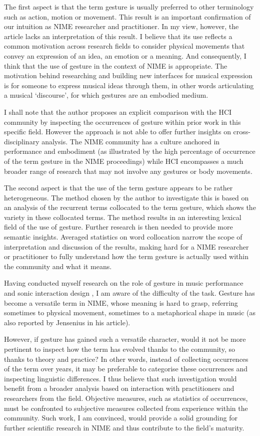 The first aspect is that the term gesture is usually preferred to other terminology such as action, motion or movement. This result is an important confirmation of our intuition as NIME researcher and practitioner. In my view, however, the article lacks an interpretation of this result. I believe that its use reflects a common motivation across research fields to consider physical movements that convey an expression of an idea, an emotion or a meaning. And consequently, I think that the use of gesture in the context of NIME is appropriate. The motivation behind researching and building new interfaces for musical expression is for someone to express musical ideas through them, in other words articulating a musical ‘discourse', for which gestures are an embodied medium. 

I shall note that the author proposes an explicit comparison with the HCI community by inspecting the occurrences of gesture within prior work in this specific field. However the approach is not able to offer further insights on cross-disciplinary analysis. The NIME community has a culture anchored in performance and embodiment (as illustrated by the high percentage of occurrence of the term gesture in the NIME proceedings) while HCI encompasses a much broader range of research that may not involve any gestures or body movements. 

The second aspect is that the use of the term gesture appears to be rather heterogeneous. The method chosen by the author to investigate this is based on an analysis of the recurrent terms collocated to the term gesture, which shows the variety in these collocated terms. The method results in an interesting lexical field of the use of gesture. Further research is then needed to provide more semantic insights. Averaged statistics on word collocation narrow the scope of interpretation and discussion of the results, making hard for a NIME researcher or practitioner to fully understand how the term gesture is actually used within the community and what it means. 

Having conducted myself research on the role of gesture in music performance and sonic interaction design \cite{Caramiaux:2012}, I am aware of the difficulty of the task. Gesture has become a versatile term in NIME, whose meaning is hard to grasp, referring sometimes to physical movement, sometimes to a metaphorical shape in music (as also reported by Jensenius in his article). 

However, if gesture has gained such a versatile character, would it not be more pertinent to inspect how the term has evolved thanks to the community, so thanks to theory and practice? In other words, instead of collecting occurrences of the term over years, it may be preferable to categorise these occurrences and inspecting linguistic differences. I thus believe that such investigation would benefit from a broader analysis based on interaction with practitioners and researchers from the field. Objective measures, such as statistics of occurrences, must be confronted to subjective measures collected from experience within the community. Such work, I am convinced, would provide a solid grounding for further scientific research in NIME and thus contribute to the field's maturity.

